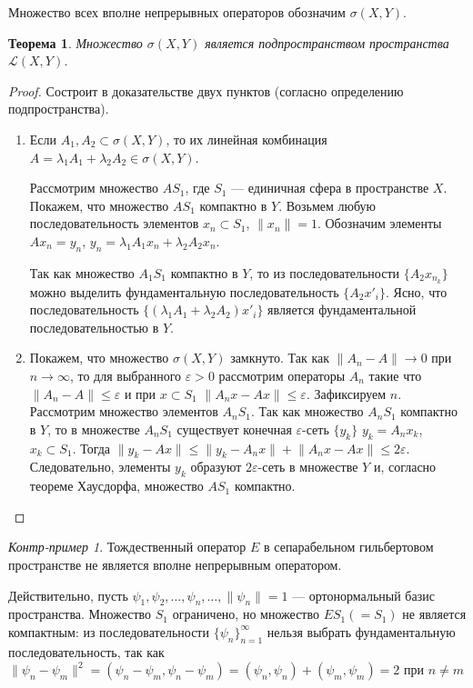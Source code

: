 \documentclass[12pt,a4paper,titlepage,oneside]{book}
\theoremstyle{definition}
\theoremstyle{plain}
\newtheorem*{theorem}{Теорема}
\theoremstyle{remark}
\theoremstyle{remark}
\theoremstyle{remark}
\theoremstyle{remark}
\newtheorem*{cexample}{Контр-пример}
\theoremstyle{plain}
\theoremstyle{plain}
\begin{document}
Множество всех вполне непрерывных операторов обозначим $\sigma(X,Y)$.
\begin{theorem}Множество $\sigma(X,Y)$ является подпространством пространства $\mathcal{L}(X, Y)$.
\end{theorem}
\begin{proof}Состроит в доказательстве двух пунктов (согласно определению подпространства).

\begin{enumerate}

	\item Если $A_1, A_2 \subset \sigma(X,Y)$, то их линейная комбинация $A=\lambda_1 A_1+\lambda_2 A_2\in \sigma(X,Y)$.

Рассмотрим множество $AS_1$, где $S_1$ --- единичная сфера в пространстве $X$. Покажем, что множество $AS_1$ компактно в $Y$. Возьмем любую последовательность элементов $x_n \subset S_1$, $\lVert x_n \rVert=1$. Обозначим элементы $Ax_n=y_n$, $y_n=\lambda_1 A_1 x_n+\lambda_2 A_2 x_n$.

Так как множество $A_1S_1$ компактно в $Y$, то из последовательности $\lbrace A_2x_{n_k} \rbrace$ можно выделить фундаментальную последовательность $\lbrace A_2x'_i \rbrace$. Ясно, что последовательность $\lbrace (\lambda_1 A_1+\lambda_2 A_2)x'_i \rbrace$ является фундаментальной последовательностью в $Y$.

	\item Покажем, что множество $\sigma(X,Y)$ замкнуто. Так как $\lVert A_n-A \rVert \to 0$ при $n\to \infty$, то для выбранного $\varepsilon > 0$ рассмотрим операторы $A_n$ такие что $\lVert A_n-A \rVert \leqslant  \varepsilon$ и при $x \subset S_1$ $\lVert A_n x-Ax\rVert \leqslant  \varepsilon$. Зафиксируем $n$. Рассмотрим множество элементов $A_n S_1$. Так как множество $A_n S_1$ компактно в $Y$, то в множестве $A_n S_1$ существует конечная $\varepsilon$-сеть $\lbrace y_k \rbrace$ $y_k=A_n x_k$, $x_k \subset S_1$. Тогда $\lVert y_k - Ax\rVert \leqslant \lVert y_k - A_n x\rVert + \lVert A_n x - Ax\rVert \leqslant 2\varepsilon$. Следовательно, элементы $y_k$ образуют $2\varepsilon$-сеть в множестве $Y$ и, согласно теореме Хаусдорфа, множество $AS_1$ компактно.
\qedhere
\end{enumerate}
\end{proof}

\begin{cexample}Тождественный оператор $E$ в сепарабельном гильбертовом пространстве не является вполне непрерывным оператором.

Действительно, пусть $\psi_1,\psi_2,\ldots,\psi_n,\ldots, \lVert\psi_n\rVert =1$ --- ортонормальный базис пространства. Множество $S_1$ ограничено, но множество $ES_1 (=S_1)$ не является компактным: из последовательности $\lbrace \psi_n \rbrace_{n=1}^{\infty}$ нельзя выбрать фундаментальную последовательность, так как $\lVert\psi_n - \psi_m \rVert ^2=(\psi_n - \psi_m, \psi_n - \psi_m)= (\psi_n,\psi_n)+ (\psi_m,\psi_m)=2$ при $n \neq m$
\end{cexample}
\end{document}
